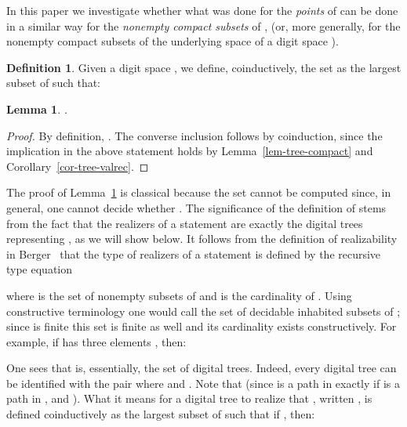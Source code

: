 \documentclass[microtype]{jloganal}
\theoremstyle{plain}
\newtheorem{lemma}[theorem]{Lemma}
\theoremstyle{definition}
\newtheorem{definition}[theorem]{Definition}
\begin{document}
In this paper we investigate whether what was done for the \emph{points} of
 can be done in a similar way for the \emph{nonempty compact subsets} of 
, (or, more generally, for the nonempty compact subsets of the 
underlying space  of a digit space ).
\begin{definition}
\label{def-coco-compact}
Given a digit space , we define, coinductively, the set 
 as the largest subset of  such that:

\end{definition}
\begin{lemma}
\label{lem-coco-compact}
.
\end{lemma}
\begin{proof}
By definition, .
The converse inclusion follows by coinduction, since
the implication in the above statement holds by Lemma~\ref{lem-tree-compact} and Corollary~\ref{cor-tree-valrec}.
\end{proof}

The proof of Lemma~\ref{lem-coco-compact} is classical because the set
 cannot be computed since, in general, one cannot decide whether 
.
The significance of the definition of  stems from the 
fact that the realizers of a statement  are 
exactly the digital trees representing , as we will show below. 
It follows from the definition of realizability in Berger~\cite{Berger11}
that the type  of realizers of a statement  
is defined by the recursive type equation
 
where  is the set of nonempty subsets of  and  is the 
cardinality of . Using 
constructive terminology one would call  the set of 
decidable inhabited subsets of ; since  is finite this set is 
finite as well and its cardinality exists constructively.
For example, if  has three elements , then:

One sees that  is, essentially, the set  of digital
trees. Indeed, every digital tree  can be identified with the pair
 where 
 and
. 
Note that  
(since  is a path in  exactly if  is a path in ,
and ).
What it means for a digital tree  to realize that 
, written ,
is defined coinductively as the largest subset  of
 such that if
, then:
\end{document}
